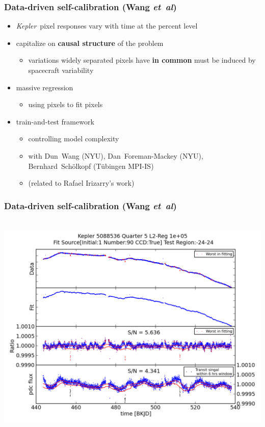 \documentclass[aspectratio=169]{beamer}
\newcommand{\foreign}[1]{\textsl{#1}}
\newcommand{\etal}{\foreign{et~al}}
\renewcommand{\emph}[1]{\textbf{#1}}
\newcommand{\project}[1]{\textsl{#1}}
\newcommand{\Kepler}{\project{Kepler}}
\begin{document}
\begin{frame}
  \frametitle{Data-driven self-calibration \small{(Wang \etal)}}
  \begin{itemize}
  \item \Kepler\ pixel responses vary with time at the percent level
  \item capitalize on \emph{causal structure} of the problem
    \begin{itemize}
    \item variations widely separated pixels have \emph{in common} must be induced by spacecraft variability
    \end{itemize}
  \item massive regression
    \begin{itemize}
    \item using pixels to fit pixels
    \end{itemize}
  \item train-and-test framework
    \begin{itemize}
    \item controlling model complexity
    \item with Dun~Wang (NYU), Dan~Foreman-Mackey (NYU), Bernhard~Sch\"olkopf (T\"ubingen MPI-IS)
    \item (related to Rafael Irizarry's work)
    \end{itemize}
  \end{itemize}
\end{frame}

\begin{frame}
  \frametitle{Data-driven self-calibration \small{(Wang \etal)}}
  ~\hfill\includegraphics[height=0.85\textheight]{lightCurve_5088536_1_90_q5_reg1e+05_pdc_outlier.png}
\end{frame}
\end{document}
